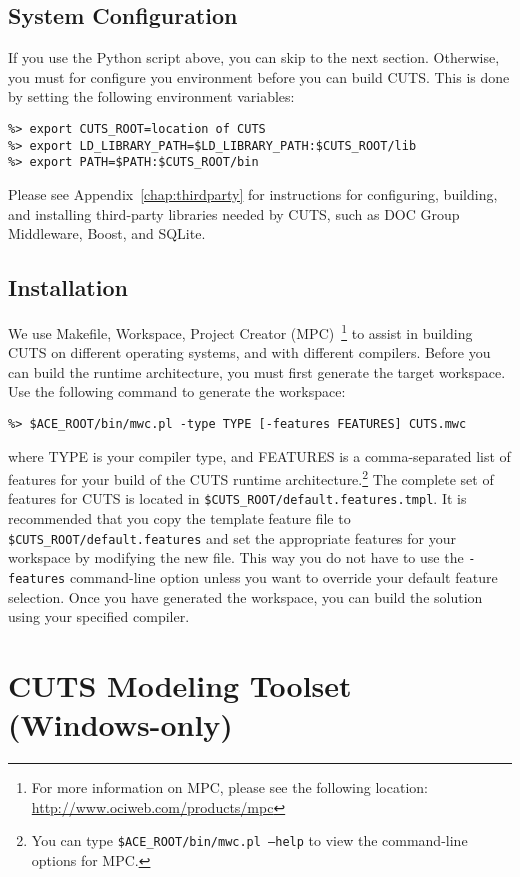 \subsection{System Configuration}

If you use the Python script above, you can skip to the next section.
Otherwise, you must for configure you environment before you can build 
CUTS. This is done by setting the following environment variables:
\begin{lstlisting}
%> export CUTS_ROOT=location of CUTS
%> export LD_LIBRARY_PATH=$LD_LIBRARY_PATH:$CUTS_ROOT/lib
%> export PATH=$PATH:$CUTS_ROOT/bin
\end{lstlisting}
Please see Appendix~\ref{chap:thirdparty} for instructions for configuring,
building, and installing third-party libraries needed by CUTS, such as 
DOC Group Middleware, Boost, and SQLite.

\subsection{Installation}

We use Makefile, Workspace, Project Creator (MPC)~\footnote{For more information
on MPC, please see the following location: \url{http://www.ociweb.com/products/mpc}}
to assist in building CUTS
on different operating systems, and with different compilers. Before you can
build the runtime architecture, you must first generate the target workspace.
Use the following command to generate the workspace:
\begin{lstlisting}
%> $ACE_ROOT/bin/mwc.pl -type TYPE [-features FEATURES] CUTS.mwc
\end{lstlisting}
where TYPE is your compiler type, and FEATURES is a comma-separated list of 
features
for your build of the CUTS runtime architecture.\footnote{You can type 
\texttt{\$ACE\_ROOT/bin/mwc.pl --help} to view the command-line options for 
MPC.} The complete set of features for CUTS is located in 
\texttt{\$CUTS\_ROOT/default.features.tmpl}. It is recommended that you copy 
the template feature file to \texttt{\$CUTS\_ROOT/default.features}
and set the appropriate features for your workspace by 
modifying the new file. This way you do not have to use 
the \texttt{-features} command-line option unless you want
to override your default feature selection. Once you have generated 
the workspace, you can build the solution using your specified compiler.

\section{CUTS Modeling Toolset (Windows-only)}


